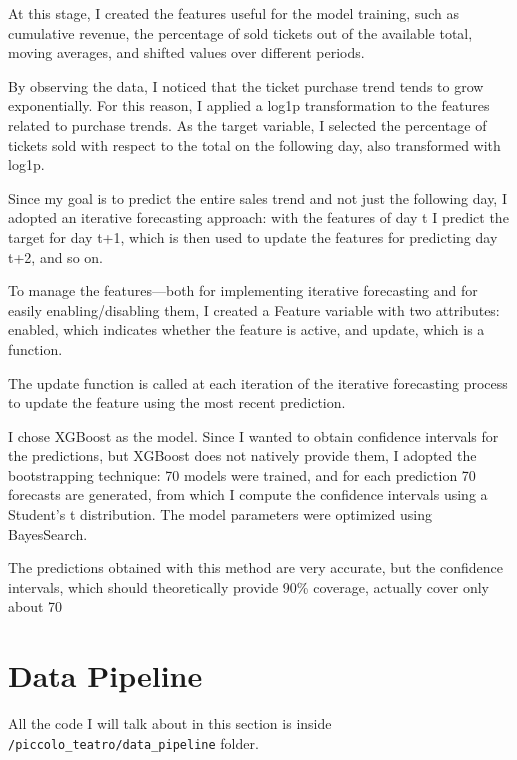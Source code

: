 \documentclass{Configuration_Files/PoliMi3i_thesis}
\begin{document}
At this stage, I created the features useful for the model training, such as cumulative revenue, the percentage of sold tickets out of the available total, moving averages, and shifted values over different periods.

By observing the data, I noticed that the ticket purchase trend tends to grow exponentially. For this reason, I applied a log1p transformation to the features related to purchase trends. As the target variable, I selected the percentage of tickets sold with respect to the total on the following day, also transformed with log1p.

Since my goal is to predict the entire sales trend and not just the following day, I adopted an iterative forecasting approach: with the features of day t I predict the target for day t+1, which is then used to update the features for predicting day t+2, and so on.

To manage the features—both for implementing iterative forecasting and for easily enabling/disabling them, I created a Feature variable with two attributes: enabled, which indicates whether the feature is active, and update, which is a function.

The update function is called at each iteration of the iterative forecasting process to update the feature using the most recent prediction.

I chose XGBoost as the model. Since I wanted to obtain confidence intervals for the predictions, but XGBoost does not natively provide them, I adopted the bootstrapping technique: 70 models were trained, and for each prediction 70 forecasts are generated, from which I compute the confidence intervals using a Student’s t distribution. The model parameters were optimized using BayesSearch.

The predictions obtained with this method are very accurate, but the confidence intervals, which should theoretically provide 90\% coverage, actually cover only about 70%

\chapter{Data Pipeline}
All the code I will talk about in this section is inside \verb|/piccolo_teatro/data_pipeline| folder.
\end{document}
